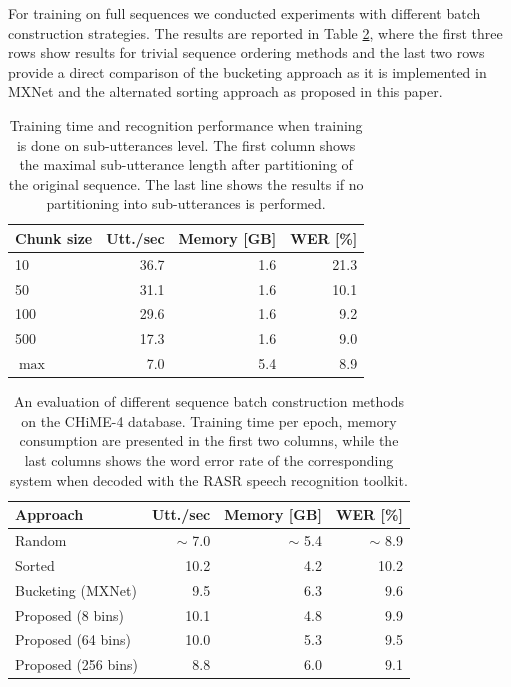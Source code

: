 \documentclass{article}
\begin{document}
   For training on full sequences we conducted experiments with different batch construction strategies.
   The results are reported in Table \ref{tab:chime:batch}, where the first three rows show results for trivial sequence ordering 
   methods and the last two rows provide a direct comparison of the bucketing approach as 
   it is implemented in MXNet and the alternated sorting approach as proposed in this paper.
    
	\begin{table}[tbp]
		\centering
		\caption{Training time and recognition performance when training is done 
		on sub-utterances level. The first column shows the maximal sub-utterance length 
		after partitioning of the original sequence. The last line shows the results 
		if no partitioning into sub-utterances is performed. }
		\label{tab:chime:chunk}
		\begin{tabular}{lrrr}
			\hline
			Chunk size              & Utt./sec & Memory [GB] & WER [\%] \\
			\hline
			10     					&	36.7   & 1.6         &	21.3     \\
			50  					&	31.1   & 1.6		 &  10.1     \\
			100 					& 	29.6   & 1.6		 &	9.2      \\
			500						& 	17.3   & 1.6         &	9.0      \\
			$\max$					&	7.0	   & 5.4         &	8.9      \\
			\hline
		\end{tabular}
	\end{table}

	\begin{table}[tbp]
		\centering
		\caption{An evaluation of different sequence batch construction methods on the CHiME-4 database. Training time per epoch, memory consumption are presented in the first two columns, while the last columns shows the word error rate of the corresponding system
		when decoded with the RASR speech recognition toolkit.}
		\label{tab:chime:batch}
		\begin{tabular}{lrrr}
			\hline
			Approach                & Utt./sec & Memory [GB] & WER [\%]          \\
			\hline
			Random 					& $\sim$ 7.0     & $\sim$ 5.4		 & $\sim$ 8.9		 \\
			Sorted					& 10.2    &	4.2 & 10.2		 \\
			\hline
			Bucketing (MXNet)		& 9.5     &	6.3		 & 9.6		 \\
			Proposed (8 bins)	    & 10.1	   & 4.8     & 9.9		 \\
			Proposed (64 bins)	    & 10.0     & 5.3     & 9.5		 \\
			Proposed (256 bins)	    & 8.8	   & 6.0     & 9.1		 \\
			\hline
		\end{tabular}
	\end{table}
\end{document}
